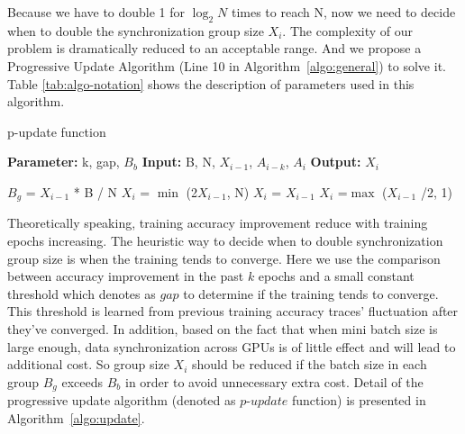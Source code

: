 \documentclass{llncs}
\begin{document}
Because we have to double 1 for $\log_2 N$ times to reach N, now we need to decide when to double the synchronization group size $X_i$. The complexity of our problem is dramatically reduced to an acceptable range. And we propose a Progressive Update Algorithm (Line 10 in Algorithm~\ref{algo:general}) to solve it. Table \ref{tab:algo-notation} shows the description of parameters used in this algorithm. 




\begin{algorithm}
    \caption{p-update function}
    \label{algo:update}
    \State \textbf{Parameter:}  k, gap, $B_b$
    \State \textbf{Input:} B, N, $X_{i-1}$, $A_{i-k}$, $A_i$
    \State \textbf{Output:} $X_i$
    \begin{algorithmic}[1]
        \State $B_g$ = $X_{i-1}$ * B / N
                \State $X_i$ = $\min$ (2$X_{i-1}$, N)
            \Else 
                \State $X_i$ = $X_{i-1}$
            \EndIf
        \Else
            \State $X_i$ =$\max$ ($X_{i-1}$ /2, 1)
        \EndIf
    \end{algorithmic}
\end{algorithm}


Theoretically speaking, training accuracy improvement reduce with training epochs increasing. The heuristic way to decide when to double synchronization group size is when the training tends to converge. Here we use the comparison between accuracy improvement in the past $k$ epochs and a small constant threshold which denotes as $gap$ to determine if the training tends to converge. This threshold is learned from previous training accuracy traces' fluctuation after they've converged. In addition, based on the fact that when mini batch size is large enough, data synchronization across GPUs is of little effect and will lead to additional cost. So group size $X_i$ should be reduced if the batch size in each group $B_g$ exceeds $B_b$ in order to avoid unnecessary extra cost. Detail of the progressive update algorithm (denoted as $p$-$update$ function) is presented in Algorithm~\ref{algo:update}.
\end{document}
